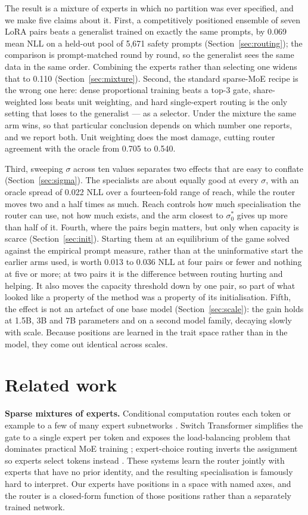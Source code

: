 \documentclass{article}
\begin{document}
The result is a mixture of experts in which no partition was ever specified, and we make five claims
about it. First, a competitively positioned ensemble of seven LoRA pairs beats a generalist trained
on exactly the same prompts, by 0.069 mean NLL on a held-out pool of 5{,}671 safety prompts
(Section~\ref{sec:routing}); the comparison is prompt-matched round by round, so the generalist sees
the same data in the same order. Combining the experts rather than selecting one widens that to 0.110
(Section~\ref{sec:mixture}). Second, the standard sparse-MoE recipe is the wrong one here: dense
proportional training beats a top-3 gate, share-weighted loss beats unit weighting, and hard
single-expert routing is the only setting that loses to the generalist --- as a selector. Under the
mixture the same arm wins, so that particular conclusion depends on which number one reports, and we
report both. Unit weighting does the most damage, cutting router agreement with the oracle from
0.705 to 0.540.

Third, sweeping $\sigma$ across ten values separates two effects that are easy to conflate
(Section~\ref{sec:sigma}). The specialists are about equally good at every $\sigma$, with an oracle
spread of 0.022 NLL over a fourteen-fold range of reach, while the router moves two and a half times
as much. Reach controls how much specialisation the router can use, not how much exists, and the arm
closest to $\sigma_0^*$ gives up more than half of it. Fourth, where the pairs begin matters, but only
when capacity is scarce (Section~\ref{sec:init}). Starting them at an equilibrium of the game solved
against the empirical prompt measure, rather than at the uninformative start the earlier arms used,
is worth 0.013 to 0.036 NLL at four pairs or fewer and nothing at five or more; at two pairs it is
the difference between routing hurting and helping. It also moves the capacity threshold down by one
pair, so part of what looked like a property of the method was a property of its initialisation.
Fifth, the effect is not an artefact of one base model (Section~\ref{sec:scale}): the gain holds at
1.5B, 3B and 7B parameters and on a second model family, decaying slowly with scale. Because
positions are learned in the trait space rather than in the model, they come out identical across
scales.

\section{Related work}
\textbf{Sparse mixtures of experts.} Conditional computation routes each token or example to a few of
many expert subnetworks \citep{shazeer2017moe}. Switch Transformer simplifies the gate to a single
expert per token and exposes the load-balancing problem that dominates practical MoE training
\citep{fedus2022switch}; expert-choice routing inverts the assignment so experts select tokens
instead \citep{zhou2022expertchoice}. These systems learn the router jointly with experts that have
no prior identity, and the resulting specialisation is famously hard to interpret. Our experts have
positions in a space with named axes, and the router is a closed-form function of those positions
rather than a separately trained network.
\end{document}

